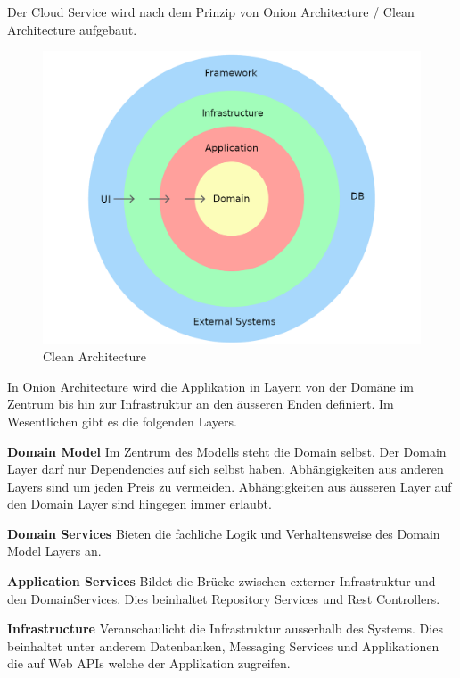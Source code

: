 Der Cloud Service wird nach dem Prinzip von Onion Architecture / Clean Architecture aufgebaut.

\begin{figure}[h]
    \centering
    \begin{minipage}[b]{0.5\textwidth}
        \includegraphics[width=\textwidth]{graphics/clean-architecture}
        \caption{Clean Architecture}
    \end{minipage}
\end{figure}

In Onion Architecture wird die Applikation in Layern von der Domäne im Zentrum bis hin zur Infrastruktur an den äusseren Enden definiert.
Im Wesentlichen gibt es die folgenden Layers\cite{medium-onion}.

\textbf{Domain Model}
Im Zentrum des Modells steht die Domain selbst.
Der Domain Layer darf nur Dependencies auf sich selbst haben.
Abhängigkeiten aus anderen Layers sind um jeden Preis zu vermeiden.
Abhängigkeiten aus äusseren Layer auf den Domain Layer sind hingegen immer erlaubt.

\textbf{Domain Services}
Bieten die fachliche Logik und Verhaltensweise des Domain Model Layers an.

\textbf{Application Services}
Bildet die Brücke zwischen externer Infrastruktur und den DomainServices.
Dies beinhaltet Repository Services und Rest Controllers.

\textbf{Infrastructure}
Veranschaulicht die Infrastruktur ausserhalb des Systems.
Dies beinhaltet unter anderem Datenbanken, Messaging Services und Applikationen die auf Web APIs welche der Applikation zugreifen.

